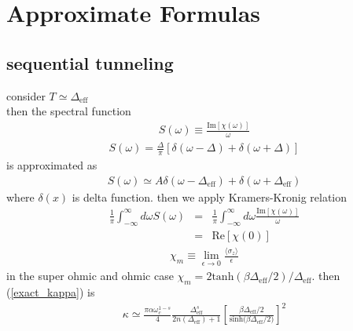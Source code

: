 \section{Approximate Formulas}
\subsection{sequential tunneling}
consider $T\simeq\mathit{\Delta}_{\mathrm{eff}}$\\
then the spectral function 
\begin{eqnarray}
	S(\omega)\equiv\frac{\mathrm{Im}[\chi(\omega)]}{\omega }
\end{eqnarray}
\begin{eqnarray}
	S(\omega) = \frac{\Delta}{\pi} \left[\delta(\omega-\Delta)+\delta(\omega+\Delta) \right]
\end{eqnarray}
is approximated as 
\begin{eqnarray}
	S(\omega)\simeq A\delta(\omega-\mathit{\Delta}_{\mathrm{eff}})+\delta(\omega+\mathit{\Delta}_{\mathrm{eff}})
\end{eqnarray}
where $\delta(x)$ is delta function.
then we apply  Kramers-Kronig relation
\begin{eqnarray}
	\frac{1}{\pi}\int_{-\infty}^{\infty}d\omega S(\omega)&=&\frac{1}{\pi}\int_{-\infty}^{\infty}d\omega \frac{\mathrm{Im}[\chi(\omega)]}{\omega}\\
&=&\mathrm{Re}[\chi (0)]
\end{eqnarray}
\begin{eqnarray}
	\chi_m \equiv \lim_{\epsilon \rightarrow 0} \frac{\langle \sigma_z \rangle}{\epsilon}
\end{eqnarray}
in the super ohmic and ohmic case $\chi_m=2\mathrm{tanh}(\beta \mathit{\Delta}_{\mathrm{eff}}/2)/\mathit{\Delta}_{\mathrm{eff}}$.
then  (\ref{exact_kappa}) is 
\begin{eqnarray}
	\kappa\simeq \frac{\pi\alpha\omega_c^{1-s}}{4}\frac{ \Delta_{\mathrm{eff}}^{s}}{2n(\Delta_{\mathrm{eff}})+1}\left[\frac{\beta\Delta_{\mathrm{eff}}/2}{\mathrm{sinh}{(\beta\Delta_{\mathrm{eff}}/2})}\right]^{2}
\end{eqnarray}

